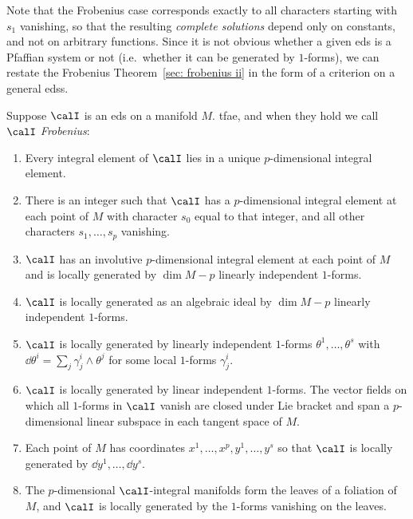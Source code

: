 Note that the Frobenius case corresponds exactly to all characters starting with $s_1$ vanishing, so that the resulting \emph{complete solutions} depend only on constants, and not on arbitrary functions. Since it is not obvious whether a given \gls{eds} is a Pfaffian system or not (i.e.\ whether it can be generated by $1$-forms), we can restate the Frobenius Theorem~\ref{sec: frobenius ii} in the form of a criterion on a general \glspl{eds}.

\begin{thm}\label{thm frobenius iii}
    Suppose $\calI$ is an \gls{eds} on a manifold $M$. \gls{tfae}, and when they hold we call $\calI$ \emph{Frobenius}:
    \begin{enumerate}
        \item Every integral element of $\calI$ lies in a unique $p$-dimensional integral element.
        \item There is an integer such that $\calI$ has a $p$-dimensional integral element at each point of $M$ with character $s_0$ equal to that integer, and all other characters $s_1,\ldots,s_p$ vanishing.
        \item $\calI$ has an involutive $p$-dimensional integral element at each point of $M$ and is locally generated by $\dim M-p$ linearly independent $1$-forms.
        \item $\calI$ is locally generated as an algebraic ideal by $\dim M-p$ linearly independent $1$-forms.
        \item $\calI$ is locally generated by linearly independent $1$-forms $\theta^1,\ldots,\theta^s$ with $\dd\theta^i=\sum_j \gamma_j^i\wedge\theta^j$ for some local $1$-forms $\gamma^i_j$.
        \item $\calI$ is locally generated by linear independent $1$-forms. The vector fields on which all $1$-forms in $\calI$ vanish are closed under Lie bracket and span a $p$-dimensional linear subspace in each tangent space of $M$.
        \item Each point of $M$ has coordinates $x^1,\ldots,x^p,y^1,\ldots,y^s$ so that $\calI$ is locally generated by $\dd y^1,\ldots,\dd y^s$.
        \item The $p$-dimensional $\calI$-integral manifolds form the leaves of a foliation of $M$, and $\calI$ is locally generated by the $1$-forms vanishing on the leaves.
    \end{enumerate}
\end{thm}








